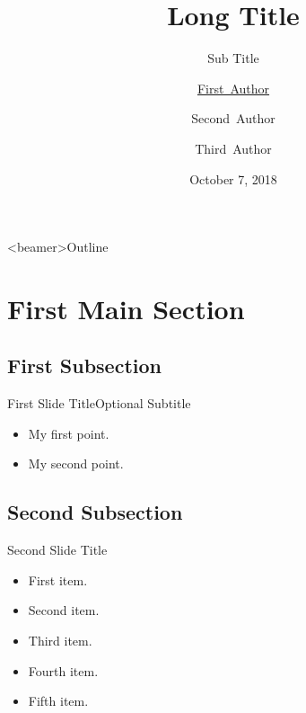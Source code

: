 \documentclass{beamer}
\title[Short Title]
{Long Title}
\subtitle{Sub Title}
\author[F. Author]
{\texorpdfstring{\underline{First~Author}}{First~Author}\inst{\dag} \and Second~Author\inst{\dag} \and Third~Author\inst{\ddag}}
\institute[NIU]%
{
 \inst{\dag}%
   Northern Illinois University, USA
   \and
   \inst{\ddag}%
   Lorem Ipsum
}
\date{October 7, 2018}
\begin{document}
\frame{\titlepage}





\begin{frame}<beamer>{Outline}
    \tableofcontents
\end{frame}

\section{First Main Section}

\subsection{First Subsection}

\begin{frame}{First Slide Title}{Optional Subtitle}
  \begin{itemize}
  \item {
    My first point.
  }
  \item {
    My second point.
  }
  \end{itemize}
\end{frame}

\subsection{Second Subsection}

\begin{frame}{Second Slide Title}
  \begin{itemize}
  \item {
    First item.
    \pause %
  }
  \item {   
    Second item.
  }
  \item<3-> {
    Third item.
  }
  \item<4-> {
    Fourth item.
  }
  \item<5-> {
    Fifth item. 
  }
  \end{itemize}
\end{frame}
\end{document}
